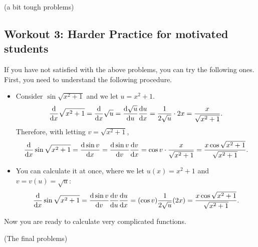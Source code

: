 \documentclass[11pt,pdfa,lastpage]{MishoNote}
\newcommand\starskip{\bigskip\begin{center}\pgfornament[width=7cm]{88}\end{center}\medskip}
\begin{document}
\newpage
\begin{enumerate}
\itemB \textsf{(a bit tough problems)}
\begin{menumerate}{3}


\end{menumerate}
\end{enumerate}

\subsection{Workout 3: Harder Practice for motivated students}
If you have not satisfied with the above problems, you can try the following ones.
First, you need to understand the following procedure.
\begin{itemize}
  \item Consider $\sin\sqrt{x^2+1}$ and we let $u=x^2+1$.
  \[
    \diff{}{x}\sqrt{x^2+1}=\diff{}{x}\sqrt u=\diff{\sqrt u}{u}\diff ux=\frac{1}{2\sqrt u}\cdot2x=\frac{x}{\sqrt{x^2+1}}.
  \]
  Therefore, with letting $v=\sqrt{x^2+1}$,
  \[
  \diff{}{x}\sin\sqrt{x^2+1}=\diff{\sin v}{x}=\diff{\sin v}{v}\diff vx=\cos v\cdot\frac{x}{\sqrt{x^2+1}}=\frac{x\cos\sqrt{x^2+1}}{\sqrt{x^2+1}}.
  \]
  \item You can calculate it at once, where we let $u(x)=x^2+1$ and $v=v(u)=\sqrt{u}$:
  \[
   \diff{}{x}\sin\sqrt{x^2+1}=\diff{\sin v}{v}\diff{v}{u}\diff{u}{x}=(\cos v)\frac{1}{2\sqrt{u}}(2x)=\frac{x\cos\sqrt{x^2+1}}{\sqrt{x^2+1}}.
   \]
\end{itemize}
Now you are ready to calculate very complicated functions.
\starskip

\begin{enumerate}
 \itemC[*] \textsf{(The final problems)}
   \begin{menumerate}{2}
   \end{menumerate}
 \end{enumerate}
\end{document}
